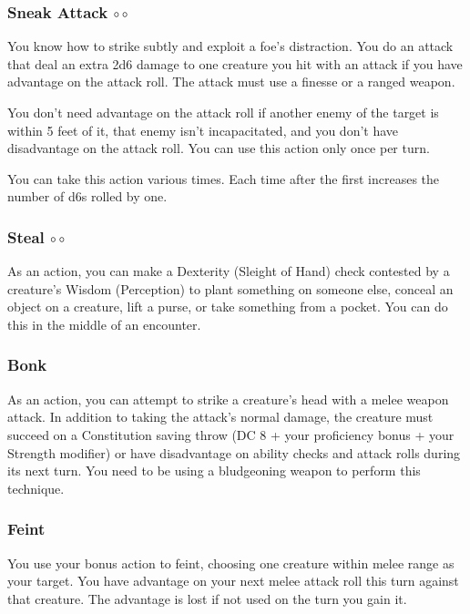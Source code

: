\subsubsection{Sneak Attack $\circ\circ$} \label{act::sneakattack}
    You know how to strike subtly and exploit a foe's distraction.
    You do an attack that deal an extra 2d6 damage to one creature you hit with an attack if you have advantage on the attack roll.
    The attack must use a finesse or a ranged weapon.

    You don't need advantage on the attack roll if another enemy of the target is within 5 feet of it, that enemy isn't incapacitated, and you don't have disadvantage on the attack roll.
    You can use this action only once per turn.

    You can take this action various times.
    Each time after the first increases the number of d6s rolled by one.

\subsubsection{Steal $\circ\circ$} \label{act::steal}
    As an action, you can make a Dexterity (Sleight of Hand) check contested by a creature's Wisdom (Perception) to plant something on someone else, conceal an object on a creature, lift a purse, or take something from a pocket.
    You can do this in the middle of an encounter.

\subsubsection{Bonk} \label{tec::bonk}
As an action, you can attempt to strike a creature's head with a melee weapon attack.
In addition to taking the attack's normal damage, the creature must succeed on a Constitution saving throw (DC 8 + your proficiency bonus + your Strength modifier) or have disadvantage on ability checks and attack rolls during its next turn.
You need to be using a bludgeoning weapon to perform this technique.

\subsubsection{Feint} \label{tec::feint}
You use your bonus action to feint, choosing one creature within melee range as your target.
You have advantage on your next melee attack roll this turn against that creature.
The advantage is lost if not used on the turn you gain it.

